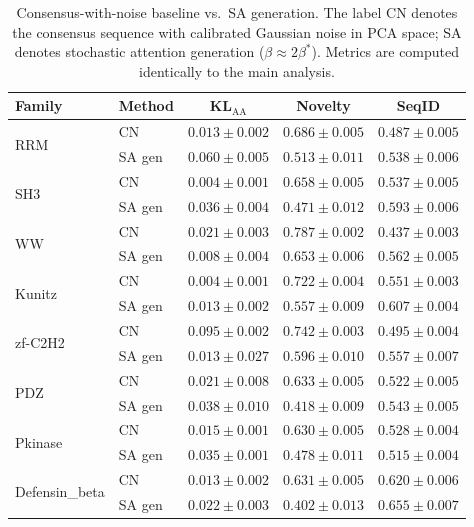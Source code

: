 \begin{table}[ht]
\centering
\caption{Consensus-with-noise baseline vs.\ SA generation. The label CN denotes the consensus sequence with calibrated Gaussian noise in PCA space; SA denotes stochastic attention generation ($\beta \approx 2\beta^*$). Metrics are computed identically to the main analysis.}
\label{tab:consensus-baseline}
\small
\begin{tabular}{@{}llccc@{}}
\toprule
Family & Method & KL$_{\mathrm{AA}}$ & Novelty & SeqID \\
\midrule
\multirow{2}{*}{RRM}
 & CN & $0.013 \pm 0.002$ & $0.686 \pm 0.005$ & $0.487 \pm 0.005$ \\
 & SA gen & $0.060 \pm 0.005$ & $0.513 \pm 0.011$ & $0.538 \pm 0.006$ \\
\midrule
\multirow{2}{*}{SH3}
 & CN & $0.004 \pm 0.001$ & $0.658 \pm 0.005$ & $0.537 \pm 0.005$ \\
 & SA gen & $0.036 \pm 0.004$ & $0.471 \pm 0.012$ & $0.593 \pm 0.006$ \\
\midrule
\multirow{2}{*}{WW}
 & CN & $0.021 \pm 0.003$ & $0.787 \pm 0.002$ & $0.437 \pm 0.003$ \\
 & SA gen & $0.008 \pm 0.004$ & $0.653 \pm 0.006$ & $0.562 \pm 0.005$ \\
\midrule
\multirow{2}{*}{Kunitz}
 & CN & $0.004 \pm 0.001$ & $0.722 \pm 0.004$ & $0.551 \pm 0.003$ \\
 & SA gen & $0.013 \pm 0.002$ & $0.557 \pm 0.009$ & $0.607 \pm 0.004$ \\
\midrule
\multirow{2}{*}{zf-C2H2}
 & CN & $0.095 \pm 0.002$ & $0.742 \pm 0.003$ & $0.495 \pm 0.004$ \\
 & SA gen & $0.013 \pm 0.027$ & $0.596 \pm 0.010$ & $0.557 \pm 0.007$ \\
\midrule
\multirow{2}{*}{PDZ}
 & CN & $0.021 \pm 0.008$ & $0.633 \pm 0.005$ & $0.522 \pm 0.005$ \\
 & SA gen & $0.038 \pm 0.010$ & $0.418 \pm 0.009$ & $0.543 \pm 0.005$ \\
\midrule
\multirow{2}{*}{Pkinase}
 & CN & $0.015 \pm 0.001$ & $0.630 \pm 0.005$ & $0.528 \pm 0.004$ \\
 & SA gen & $0.035 \pm 0.001$ & $0.478 \pm 0.011$ & $0.515 \pm 0.004$ \\
\midrule
\multirow{2}{*}{Defensin\_beta}
 & CN & $0.013 \pm 0.002$ & $0.631 \pm 0.005$ & $0.620 \pm 0.006$ \\
 & SA gen & $0.022 \pm 0.003$ & $0.402 \pm 0.013$ & $0.655 \pm 0.007$ \\
\bottomrule
\end{tabular}
\end{table}

